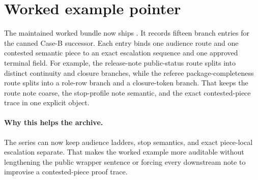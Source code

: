 \documentclass[11pt]{article}
\begin{document}
\section{Worked example pointer}
The maintained worked bundle now ships .\cite{series:workedexample}
It records fifteen branch entries for the canned Case-B successor.
Each entry binds one audience route and one contested semantic piece to an exact escalation sequence and one approved terminal field.
For example, the release-note public-status route splits into distinct continuity and closure branches, while the referee package-completeness route splits into a role-row branch and a closure-token branch.
That keeps the route note coarse, the stop-profile note semantic, and the exact contested-piece trace in one explicit object.\cite{series:challengeroutes,series:challengestops}

\paragraph{Why this helps the archive.}
The series can now keep audience ladders, stop semantics, and exact piece-local escalation separate.
That makes the worked example more auditable without lengthening the public wrapper sentence or forcing every downstream note to improvise a contested-piece proof trace.
\end{document}
